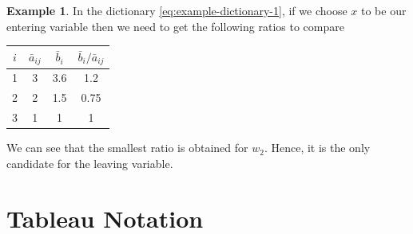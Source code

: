 \documentclass[
]{book}
\theoremstyle{definition}
\theoremstyle{definition}
\newtheorem{example}{Example}[chapter]
\theoremstyle{definition}
\theoremstyle{definition}
\theoremstyle{remark}
\begin{document}
\begin{example}

In the dictionary \eqref{eq:example-dictionary-1}, if we choose \(x\) to be our entering variable then we need to get the following ratios to compare

\begin{longtable}[]{@{}cccc@{}}
\toprule
\(i\) & \(\bar{a}_{ij}\) & \(\bar{b}_i\) & \(\bar{b}_i/\bar{a}_{ij}\) \\
\midrule
\endhead
1 & 3 & 3.6 & 1.2 \\
2 & 2 & 1.5 & 0.75 \\
3 & 1 & 1 & 1 \\
\bottomrule
\end{longtable}

\end{example}

We can see that the smallest ratio is obtained for \(w_2\). Hence, it is the only candidate for the leaving variable.

\hypertarget{tableau-notation}{%
\section{Tableau Notation}\label{tableau-notation}}
\end{document}
